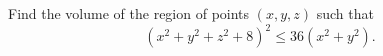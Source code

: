 Find the volume of the region of points $(x,y,z)$ such that
\[
(x^2 + y^2 + z^2 + 8)^2 \leq 36(x^2 + y^2).
\]
